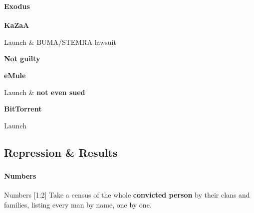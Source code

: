     \begin{frame}
      \frametitle{\subsecname}
      \framesubtitle{Exodus}

      {\large\bf KaZaA}
      \begin{description}[XXXX]
        \item[2001] Launch \& \textsc{BUMA/STEMRA} lawsuit
        \item[2002] \textbf{Not guilty}
      \end{description} \pause
      \vspace{1em}

      {\large\bf eMule}
      \begin{description}[XXXX]
        \item[2002] Launch \& \textbf{not even sued}
      \end{description} \pause
      \vspace{1em}

      {\large\bf BitTorrent}
      \begin{description}[XXXX]
        \item[2002] Launch
      \end{description}
    \end{frame}

  \subsection{Repression \& Results}
    \begin{frame}
      \frametitle{\subsecname}
      \framesubtitle{Numbers}

      \begin{block}{Numbers [1:2]}
        Take a census of the whole \textbf{convicted person} by their
        clans and families, listing every man by name, one by one.
      \end{block}
    \end{frame}

